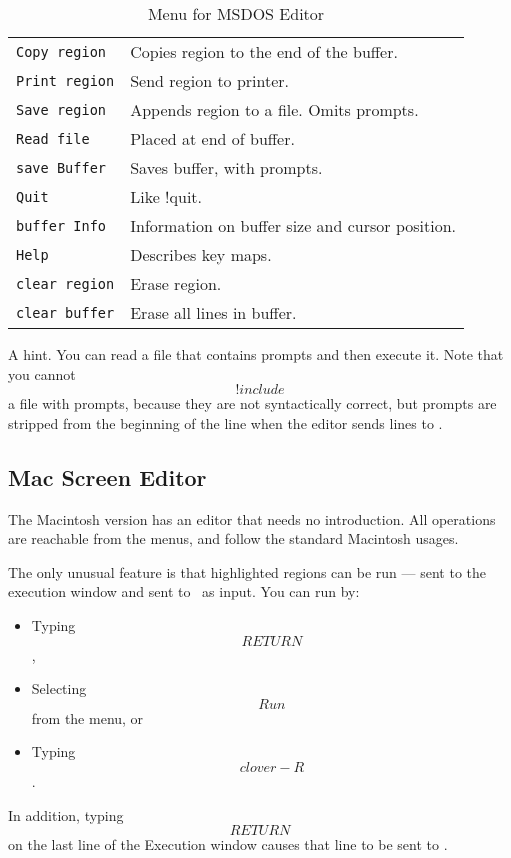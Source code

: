 {\begin{table}[ht]
\caption{Menu for MSDOS Editor}
\begin{center}
  \begin{tabular}{l p{}}
    \tt Copy region&	Copies region to the end of the buffer.\\
    \tt Print region&	Send region to printer.\\
    \tt Save region&	Appends region to a file.
       			Omits prompts.\\
    \tt Read file&	Placed at end of buffer.\\
    \tt save Buffer&	Saves buffer, with prompts.\\
    \tt Quit& 		Like !quit.\\
    \tt buffer Info&	Information on buffer size and cursor position.\\
    \tt Help&		Describes key maps.\\
    \tt clear region&	Erase region.\\
    \tt clear buffer&	Erase all lines in buffer.
  \end{tabular}
  \end{center}
\end{table}


A hint.  You can read a file that contains prompts and then execute
it.  Note that you cannot \[!include\] a file with prompts, because they
are not syntactically correct, but prompts are stripped from the
beginning of the line when the editor sends lines to \ISETL.



\subsection{Mac Screen Editor}

The Macintosh version has an editor that needs no introduction.
All operations are reachable from the menus, and follow the standard
Macintosh usages.

The only unusual feature is that highlighted regions can be run ---
sent to the execution window and sent to \ISETL\ as input.
You can run by:
\begin{itemize}
    \item Typing \[RETURN\],
    \item Selecting \[Run\] from the menu, or
    \item Typing \[clover-R\].
\end{itemize}
In addition, typing \[RETURN\] on the last line of the Execution
window causes that line to be sent to \ISETL\@.

}
